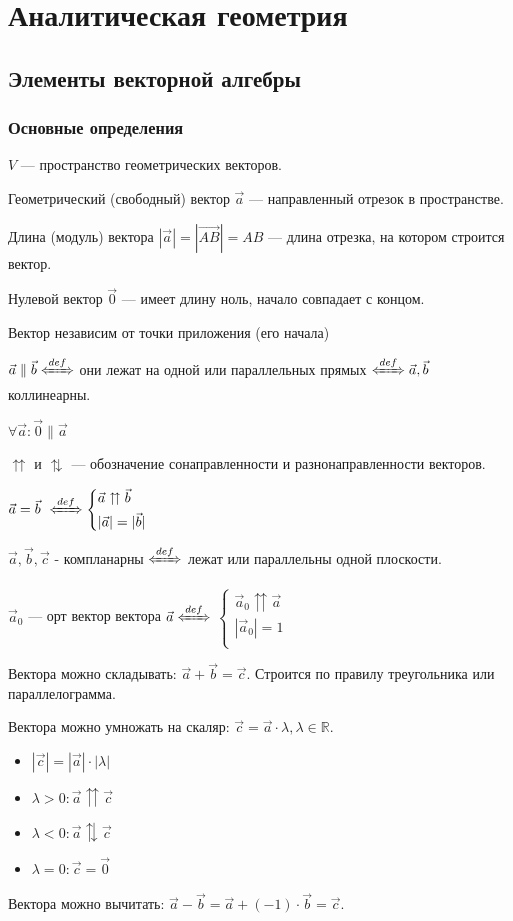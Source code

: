 \chapter{Аналитическая геометрия}
\section{Элементы векторной алгебры}
\subsection{Основные определения}
\(V\) --- пространство геометрических векторов.

Геометрический (свободный) вектор \(\vec a\) --- направленный отрезок в пространстве.

Длина (модуль) вектора \(|\vec a| = |\overrightarrow{AB}| = AB\) --- длина отрезка, на котором строится вектор.

Нулевой вектор \(\vec 0\) --- имеет длину ноль, начало совпадает с концом.

Вектор независим от точки приложения (его начала)

\(\vec a \parallel \vec b \defLeftrightarrow\) они лежат на одной или параллельных прямых \(\defLeftrightarrow\vec a,\vec b\) коллинеарны.

\(\forall \vec a:\vec 0 \parallel \vec a\)

\(\upuparrows\) и \(\updownarrows\) --- обозначение сонаправленности и разнонаправленности векторов.

\(
\vec a = \vec b\ \defLeftrightarrow
\begin{cases*}
    \vec a \upuparrows \vec b \\
    |\vec a| = |\vec b|       \\
\end{cases*}
\)

\(\vec a, \vec b, \vec c\) - компланарны \(\defLeftrightarrow\) лежат или параллельны одной плоскости.

\(\vec a_0\) --- орт вектор вектора \(\vec a \defLeftrightarrow\)
\(
\begin{cases*}
    \vec a_0 \upuparrows \vec a \\
    |\vec a_0| = 1              \\
\end{cases*}
\)

Вектора можно складывать: \(\vec a + \vec b = \vec c\). Строится по правилу треугольника или параллелограмма.

Вектора можно умножать на скаляр: \(\vec c = \vec a \cdot \lambda, \lambda \in \mathbb R\).
\begin{itemize}
    \item[] \(|\vec c| = |\vec a| \cdot |\lambda|\)
    \item[] \(\lambda > 0: \vec a \upuparrows \vec c\)
    \item[] \(\lambda < 0: \vec a \updownarrows \vec c\)
    \item[] \(\lambda = 0: \vec c = \vec 0\)
\end{itemize}
Вектора можно вычитать: \(\vec a - \vec b = \vec a + (-1) \cdot \vec b = \vec c\).

